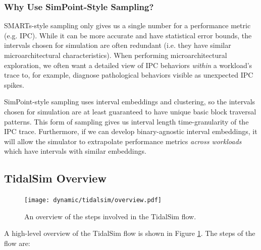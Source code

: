 \documentclass[sigplan,nonacm,10pt]{acmart}
\begin{document}
\subsubsection{Why Use SimPoint-Style Sampling?}


SMARTs-style sampling only gives us a single number for a performance metric (e.g. IPC).
While it can be more accurate and have statistical error bounds, the intervals chosen for simulation are often redundant (i.e. they have similar microarchitectural characteristics).
When performing microarchitectural exploration, we often want a detailed view of IPC behaviors \textit{within} a workload's trace to, for example, diagnose pathological behaviors visible as unexpected IPC spikes.

SimPoint-style sampling uses interval embeddings and clustering, so the intervals chosen for simulation are at least guaranteed to have unique basic block traversal patterns.
This form of sampling gives us interval length time-granularity of the IPC trace.
Furthermore, if we can develop binary-agnostic interval embeddings, it will allow the simulator to extrapolate performance metrics \textit{across workloads} which have intervals with similar embeddings.

\subsection{TidalSim Overview}

\begin{figure}
  \texttt{[image: dynamic/tidalsim/overview.pdf]}
  \caption{An overview of the steps involved in the TidalSim flow.}
  \label{fig:tidalsim_overview}
\end{figure}

A high-level overview of the TidalSim flow is shown in Figure \ref{fig:tidalsim_overview}.
The steps of the flow are:
\end{document}
